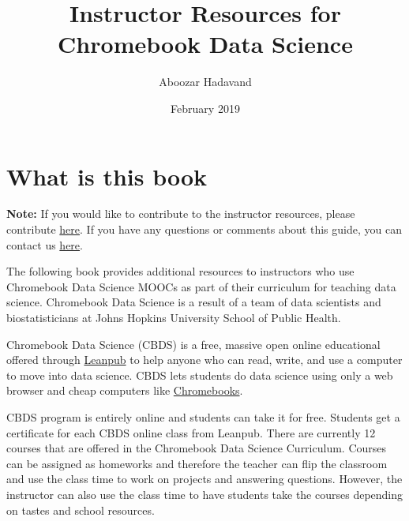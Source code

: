 \documentclass[]{book}
\title{Instructor Resources for Chromebook Data Science}
\author{Aboozar Hadavand}
\date{February 2019}
\begin{document}
\maketitle

{
\setcounter{tocdepth}{1}
\tableofcontents
}
\hypertarget{what-is-this-book}{%
\chapter*{What is this book}\label{what-is-this-book}}

\textbf{Note:} If you would like to contribute to the instructor resources, please contribute \url{here}. If you have any questions or comments about this guide, you can contact us \href{http://jhudatascience.org/chromebookdatascience/contact.html}{here}.

The following book provides additional resources to instructors who use Chromebook Data Science MOOCs as part of their curriculum for teaching data science. Chromebook Data Science is a result of a team of data scientists and biostatisticians at Johns Hopkins University School of Public Health.

Chromebook Data Science (CBDS) is a free, massive open online educational offered through \href{https://leanpub.com/universities/set/jhu/chromebook-data-science}{Leanpub} to help anyone who can read, write, and use a computer to move into data science. CBDS lets students do data science using only a web browser and cheap computers like \href{https://www.google.com/chromebook}{Chromebooks}.

CBDS program is entirely online and students can take it for free. Students get a certificate for each CBDS online class from Leanpub. There are currently 12 courses that are offered in the Chromebook Data Science Curriculum. Courses can be assigned as homeworks and therefore the teacher can flip the classroom and use the class time to work on projects and answering questions. However, the instructor can also use the class time to have students take the courses depending on tastes and school resources.
\end{document}
